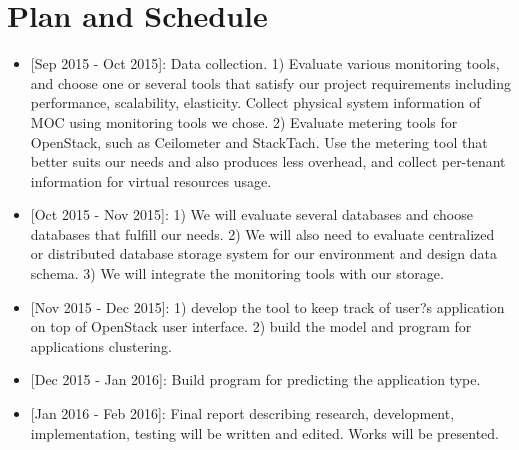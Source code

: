 \section{Plan and Schedule}
\label{sec:Plan}

\begin{itemize}
\item{[Sep 2015 - Oct 2015]:} Data collection. 1) Evaluate various monitoring tools, and choose one or several tools that satisfy our project requirements including performance, scalability, elasticity. Collect physical system information of MOC using monitoring tools we chose. 2) Evaluate metering tools for OpenStack, such as Ceilometer and StackTach. Use the metering tool that better suits our needs and also produces less overhead, and collect per-tenant information for virtual resources usage.
\item{[Oct 2015 - Nov 2015]:} 1) We will evaluate several databases and choose databases that fulfill our needs. 2) We will also need to evaluate centralized or distributed database storage system for our environment and design data schema. 3) We will integrate the monitoring tools with our storage.
\item{[Nov 2015 - Dec 2015]:} 1) develop the tool to keep track of user?s application on top of OpenStack user interface. 2) build the model and program for applications clustering.
\item{[Dec 2015 - Jan 2016]:} Build program for predicting the application type.
\item{[Jan 2016 - Feb 2016]:} Final report describing research, development, implementation, testing will be written and edited. Works will be presented.
\end{itemize}
